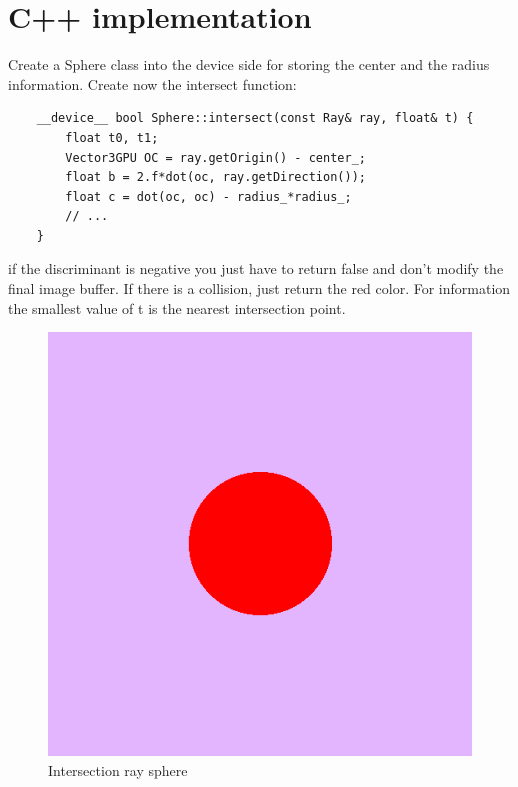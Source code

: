 \documentclass{article}
\begin{document}
\section{C++ implementation}
Create a Sphere class into the device side for storing the center and the radius information. Create now the intersect function: 
\begin{lstlisting}
	__device__ bool Sphere::intersect(const Ray& ray, float& t) {
		float t0, t1;
		Vector3GPU OC = ray.getOrigin() - center_;
		float b = 2.f*dot(oc, ray.getDirection());
		float c = dot(oc, oc) - radius_*radius_;
		// ...
	}
\end{lstlisting}
if the discriminant is negative you just have to return false and don't modify the final image buffer. If there is a collision, just return the red color. For information the smallest value of t is the nearest intersection point.
\begin{figure}[h]
	\centering
	\includegraphics[scale=0.6]{figures/intersect.png}
	\caption{Intersection ray sphere}
\end{figure}

\newpage
\end{document}
